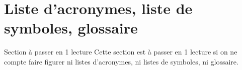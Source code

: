 
\section{Liste d'acronymes, liste de symboles,
  glossaire}\label{sec:sigl-gloss-nomencl}

\begin{dbremark*}{Section à passer en 1\iere{} lecture}
  Cette section est à passer en 1\iere{} lecture si on ne compte faire figurer
  ni listes d'acronymes, ni listes de symboles, ni glossaire.
\end{dbremark*}


